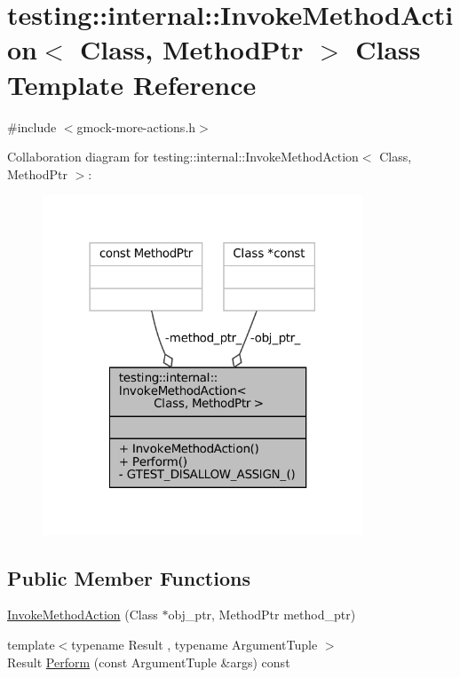 \hypertarget{classtesting_1_1internal_1_1InvokeMethodAction}{}\section{testing\+:\+:internal\+:\+:Invoke\+Method\+Action$<$ Class, Method\+Ptr $>$ Class Template Reference}
\label{classtesting_1_1internal_1_1InvokeMethodAction}


{\ttfamily \#include $<$gmock-\/more-\/actions.\+h$>$}



Collaboration diagram for testing\+:\+:internal\+:\+:Invoke\+Method\+Action$<$ Class, Method\+Ptr $>$\+:
\nopagebreak
\begin{figure}[H]
\begin{center}
\leavevmode
\includegraphics[width=270pt]{classtesting_1_1internal_1_1InvokeMethodAction__coll__graph}
\end{center}
\end{figure}
\subsection*{Public Member Functions}
\begin{DoxyCompactItemize}
\item 
\hyperlink{classtesting_1_1internal_1_1InvokeMethodAction_a16e545f6166e2d54eeafdc2ab3adf06b}{Invoke\+Method\+Action} (Class $\ast$obj\+\_\+ptr, Method\+Ptr method\+\_\+ptr)
\item 
{\footnotesize template$<$typename Result , typename Argument\+Tuple $>$ }\\Result \hyperlink{classtesting_1_1internal_1_1InvokeMethodAction_aed6971c668bc2c7671d512306b25b1ab}{Perform} (const Argument\+Tuple \&args) const
\end{DoxyCompactItemize}
